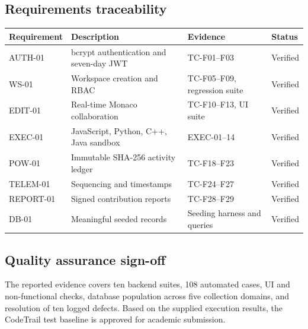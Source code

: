 \documentclass[11pt,a4paper]{article}
\newcommand{\tableheader}[1]{\textbf{#1}}
\begin{document}
\subsection{Requirements traceability}
\begin{tabularx}{\textwidth}{L{2.0cm} Y L{3.5cm} C{1.3cm}}
\toprule
{}
\tableheader{Requirement} & \tableheader{Description} & \tableheader{Evidence} & \tableheader{Status}\\
\midrule
AUTH-01 & bcrypt authentication and seven-day JWT & TC-F01--F03 & Verified\\
WS-01 & Workspace creation and RBAC & TC-F05--F09, regression suite & Verified\\
EDIT-01 & Real-time Monaco collaboration & TC-F10--F13, UI suite & Verified\\
EXEC-01 & JavaScript, Python, C++, Java sandbox & EXEC-01--14 & Verified\\
POW-01 & Immutable SHA-256 activity ledger & TC-F18--F23 & Verified\\
TELEM-01 & Sequencing and timestamps & TC-F24--F27 & Verified\\
REPORT-01 & Signed contribution reports & TC-F28--F29 & Verified\\
DB-01 & Meaningful seeded records & Seeding harness and queries & Verified\\
\bottomrule
\end{tabularx}

\subsection{Quality assurance sign-off}
The reported evidence covers ten backend suites, 108 automated cases, UI and
non-functional checks, database population across five collection domains, and
resolution of ten logged defects. Based on the supplied execution results, the
CodeTrail test baseline is approved for academic submission.
\end{document}
